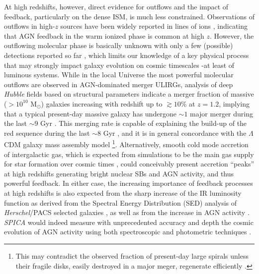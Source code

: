 \documentclass{pasa}%
\newcommand{\Msun}{{\hbox {M$_\odot$}}}
\begin{document}
At high redshifts, however, direct evidence for outflows and the impact
  of feedback, particularly on the dense ISM, is much less
  constrained. Observations of outflows in high-$z$ sources have been  
widely reported in lines of ions 
\citep[e.g.][]{vil11,far12,can12,har12,bar13,gen14,carn15,zak16,nes16}, 
indicating that AGN feedback in the warm ionized phase is common at high $z$.
However, the outflowing molecular phase is basically unknown with only
a few (possible) detections reported so far
\citep[][]{pol11,nes11,gea14,falg15,feru17}, 
which limits our knowledge of a key physical process that may strongly impact
galaxy evolution on cosmic timescales -at least of luminous systems. While in
the local Universe the most powerful molecular outflows are observed in
AGN-dominated merger ULIRGs,  
analysis of deep {\it Hubble} fields based on structural parameters indicate a
merger fraction of massive ($>10^{10}$ \Msun) galaxies increasing with
redshift up to $\gtrsim10$\% at $z=1.2$, implying that a typical present-day
massive galaxy has undergone $\sim1$ major merger during the last $\sim9$ Gyr
\citep{con09,rob10,xu12}. This merging rate is capable of explaining the
build-up of the red sequence during the last $\sim8$ Gyr 
\citep{eli10,xu12,pri13},
and it is in general concordance with the $\Lambda$CDM galaxy mass assembly
model \citep{con14}\footnote{This may contradict 
  the observed fraction of present-day large spirals unless their fragile
  disks, easily destroyed in a major meger, regenerate efficiently
  \citep[e.g.][]{ham09,pue12}.}. Alternatively, smooth cold mode
accretion of intergalactic gas, which is expected from simulations to be the
main gas supply for star formation over cosmic times 
\citep[e.g.][]{mur02,ker05,ker09},  
could conceivably present accretion ``peaks'' at high redshifts generating
bright nuclear SBs and AGN activity, and thus powerful
feedback. In either case, the increasing importance of feedback processes at
high redshifts is also expected from the sharp increase of the IR luminosity
function as derived from the Spectral Energy Distribution (SED) analysis of
{\it Herschel}/PACS selected galaxies \citep{gru13}, as well as from the
increase in AGN activity \citep{hop07,mer08,del14}.
{\it SPICA} would indeed measure with unprecedented
accuracy and depth the cosmic evolution of AGN activity using both
spectroscopic and photometric techniques 
\citep[see the accompanying papers][]{spi17,gru17}.
\end{document}
